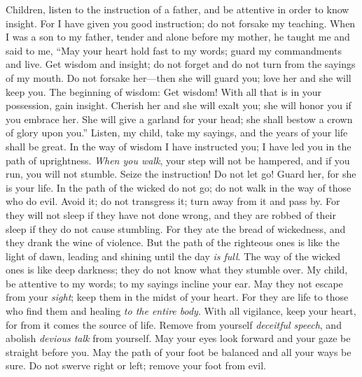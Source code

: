 \begin{biblechapter} %
 Children, listen to the instruction of a father, 
and be attentive in order to know insight.
\verse For I have given you good instruction; 
do not forsake my teaching.
\verse When I was a son to my father, 
tender and alone before my mother,
\verse he taught me and said to me, 
“May your heart hold fast to my words; 
guard my commandments and live.
\verse Get wisdom and insight; 
do not forget and do not turn from the sayings of my mouth.
\verse Do not forsake her—then she will guard you; 
love her and she will keep you.
\verse The beginning of wisdom: Get wisdom! 
With all that is in your possession, gain insight.
\verse Cherish her and she will exalt you; 
she will honor you if you embrace her.
\verse She will give a garland for your head; 
she shall bestow a crown of glory upon you.”
 Listen, my child, take my sayings, 
and the years of your life shall be great.
\verse In the way of wisdom I have instructed you; 
I have led you in the path of uprightness.
\verse \textit{When you walk}, your step will not be hampered, 
and if you run, you will not stumble.
\verse Seize the instruction! Do not let go! 
Guard her, for she is your life.
\verse In the path of the wicked do not go; 
do not walk in the way of those who do evil.
\verse Avoid it; do not transgress it; 
turn away from it and pass by.
\verse For they will not sleep if they have not done wrong, 
and they are robbed of their sleep if they do not cause stumbling.
\verse For they ate the bread of wickedness, 
and they drank the wine of violence.
\verse But the path of the righteous ones is like the light of dawn, 
leading and shining until the day \textit{is full}.
\verse The way of the wicked ones is like deep darkness; 
they do not know what they stumble over.
 My child, be attentive to my words; 
to my sayings incline your ear.
\verse May they not escape from your \textit{sight}; 
keep them in the midst of your heart.
\verse For they are life to those who find them 
and healing \textit{to the entire body}.
\verse With all vigilance, keep your heart, 
for from it comes the source of life.
\verse Remove from yourself \textit{deceitful speech}, 
and abolish \textit{devious talk} from yourself.
\verse May your eyes look forward 
and your gaze be straight before you.
\verse May the path of your foot be balanced 
and all your ways be sure.
\verse Do not swerve right or left; 
remove your foot from evil.
\end{biblechapter}

